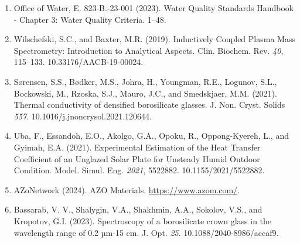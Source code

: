 \documentclass[11pt]{article}
\begin{document}
\begin{enumerate}[leftmargin=2em,itemsep=0.25em]
\item Office of Water, E. 823-B.-23-001 (2023). Water Quality Standards Handbook - Chapter 3: Water Quality Criteria. 1--48.
\item Wilschefski, S.C., and Baxter, M.R. (2019). Inductively Coupled Plasma Mass Spectrometry: Introduction to Analytical Aspects. Clin. Biochem. Rev. \textit{40}, 115--133. 10.33176/AACB-19-00024.
\item Sørensen, S.S., Bødker, M.S., Johra, H., Youngman, R.E., Logunov, S.L., Bockowski, M., Rzoska, S.J., Mauro, J.C., and Smedskjaer, M.M. (2021). Thermal conductivity of densified borosilicate glasses. J. Non. Cryst. Solids \textit{557}. 10.1016/j.jnoncrysol.2021.120644.
\item Uba, F., Essandoh, E.O., Akolgo, G.A., Opoku, R., Oppong-Kyereh, L., and Gyimah, E.A. (2021). Experimental Estimation of the Heat Transfer Coefficient of an Unglazed Solar Plate for Unsteady Humid Outdoor Condition. Model. Simul. Eng. \textit{2021}, 5522882. 10.1155/2021/5522882.
\item AZoNetwork (2024). AZO Materials. \url{https://www.azom.com/}.
\item Bassarab, V. V., Shalygin, V.A., Shakhmin, A.A., Sokolov, V.S., and Kropotov, G.I. (2023). Spectroscopy of a borosilicate crown glass in the wavelength range of 0.2 µm-15 cm. J. Opt. \textit{25}. 10.1088/2040-8986/accaf9.
\end{enumerate}
\end{document}
